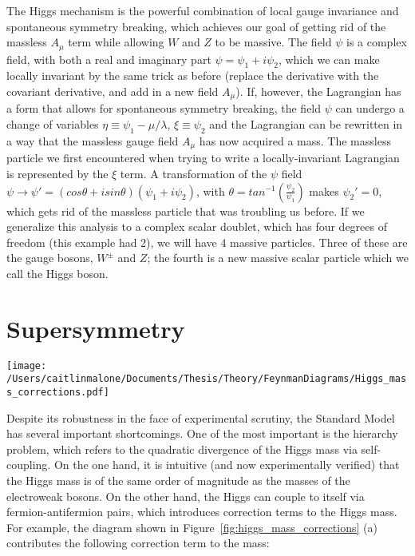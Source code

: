 The Higgs mechanism is the powerful combination of local gauge invariance and spontaneous symmetry breaking, which achieves our goal of getting rid of the massless $A_\mu$ term while allowing $W$ and $Z$ to be massive.  The field $\psi$ is a complex field, with both a real and imaginary part $\psi=\psi_1+i\psi_2$, which we can make locally invariant by the same trick as before (replace the derivative with the covariant derivative, and add in a new field $A_\mu$).  If, however, the Lagrangian has a form that allows for spontaneous symmetry breaking, the field $\psi$ can undergo a change of variables $\eta\equiv \psi_1 - \mu/\lambda$, $\xi\equiv \psi_2$ and the Lagrangian can be rewritten in a way that the massless gauge field $A_\mu$ has now acquired a mass.  The massless particle we first encountered when trying to write a locally-invariant Lagrangian is represented by the $\xi$ term.  A transformation of the $\psi$ field $\psi \rightarrow \psi' = (cos\theta + i sin\theta)(\psi_1+i\psi_2)$, with $\theta=tan^{-1}(\frac{\psi_2}{\psi_1})$ makes $\psi_2'=0$, which gets rid of the massless particle that was troubling us before.  If we generalize this analysis to a  complex scalar doublet, which has four degrees of freedom (this example had 2), we will have 4 massive particles.  Three of these are the gauge bosons, $W^\pm$ and $Z$; the fourth is a new massive scalar particle which we call the Higgs boson.



 
 
 
\section{Supersymmetry}

\begin{centering}
\texttt{[image: /Users/caitlinmalone/Documents/Thesis/Theory/FeynmanDiagrams/Higgs\_mass\_corrections.pdf]}\label{fig:higgs_mass_corrections}
\end{centering}

Despite its robustness in the face of experimental scrutiny, the Standard Model has several important shortcomings.  One of the most important is the hierarchy problem, which refers to the quadratic divergence of the Higgs mass via self-coupling.  On the one hand, it is intuitive (and now experimentally verified) that the Higgs mass is of the same order of magnitude as the masses of the electroweak bosons.  On the other hand, the Higgs can couple to itself via fermion-antifermion pairs, which introduces correction terms to the Higgs mass.  For example, the diagram shown in Figure~\ref{fig:higgs_mass_corrections} (a) contributes the following correction term to the mass:

